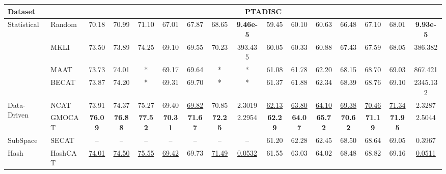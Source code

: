 \begin{table}[!t]
{\begin{tabular}{l l|ccc|ccc|c|ccc|ccc|c}
    \multicolumn{2}{l|}{Dataset} & \multicolumn{14}{c}{PTADISC} \\
    \midrule
    \multirow{4}[8]{*}{Statistical} & Random & 70.18 & 70.99 &71.10 & 67.01 & 67.87 & 68.65 & \textbf{9.46e-5} & 59.45 & 60.10 & 60.63 & 66.48 & 67.10 & 68.01 & \textbf{9.93e-5} \\
    \cmidrule{3-16} & MKLI & 73.50 & 73.89 & 74.25 & 69.10 & 69.55 & 70.23 & 393.435 & 60.05 & 60.33 & 60.88 & 67.43 & 67.59 & 68.05 & 386.382 \\
    \cmidrule{3-16} & MAAT & 73.73 & 74.01 & * &69.17  &69.64  &*  & * & 61.08 & 61.78 & 62.20 & 68.15 & 68.70 & 69.03& 867.421 \\
    \cmidrule{3-16} & BECAT & 73.87 &74.20  & * & 69.31 &69.70  & *& * &61.37 & 61.88&62.34 &68.39 & 68.76&69.10 &2345.132 \\
    \midrule
    \multirow{2}{*}{Data-Driven} & NCAT & 73.91 &  74.37&  75.27& 69.40 & \underline{69.82} & 70.85 &2.3019 &\underline{62.13}& \underline{63.80}& \underline{64.10}&\underline{69.38} & \underline{70.46}&\underline{71.34}& 2.3287\\
    \cmidrule{3-16} & GMOCAT &\textbf{ 76.09} & \textbf{76.88} & \textbf{77.52} & \textbf{70.31} & \textbf{71.67} &\textbf{72.25} & 2.2954 &\textbf{62.29}& \textbf{64.07}& \textbf{65.72}& \textbf{70.62}& \textbf{71.19}& \textbf{71.95}& 2.5044\\
    \midrule
    SubSpace & SECAT & -- &--  & -- & -- &-- & -- & --&61.20&62.28 & 62.45&  68.50& 68.64& 69.05&0.3967 \\
    \midrule
    Hash & HashCAT & \cellcolor{gray!25}\underline{74.01}& \cellcolor{gray!25}\underline{74.50} & \cellcolor{gray!25}\underline{75.55} &\cellcolor{gray!25}\underline{69.42} &\cellcolor{gray!25}69.73 & \cellcolor{gray!25}\underline{71.49} &  \cellcolor{gray!25}\underline{0.0532}& \cellcolor{gray!25}61.55 &\cellcolor{gray!25} 63.03 &\cellcolor{gray!25}64.02  &\cellcolor{gray!25}68.48  & \cellcolor{gray!25}68.82 &\cellcolor{gray!25}69.16  & \cellcolor{gray!25}\underline{0.0511} \\
    
   \hline   
  
    \bottomrule
  
    \end{tabular}
 }
  
 
  \label{approach}%
  \vspace{-5mm}

\end{table}
